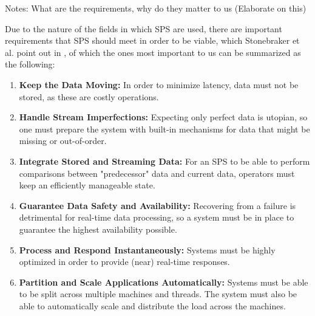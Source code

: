         Notes: What are the requirements, why do they matter to us (Elaborate on this)

        Due to the nature of the fields in which SPS are used, there are important requirements that SPS should meet in order to be viable, 
        which Stonebraker et al. point out in \cite{Stonebraker:2005:RRS:1107499.1107504}, of which the ones most important to us can be summarized as the following:
        
        \begin{enumerate}
        \label{enum:requirements}
            \item \textbf{Keep the Data Moving:} 
                In order to minimize latency, data must not be stored, as these are costly operations.
            \item \textbf{Handle Stream Imperfections:} 
                Expecting only perfect data is utopian, so one must prepare the system with built-in mechanisms for data that might be missing or out-of-order.
            \item \textbf{Integrate Stored and Streaming Data:} 
                For an SPS to be able to perform comparisons between "predecessor" data and current data, operators must keep an efficiently manageable state.
            \item \textbf{Guarantee Data Safety and Availability:} 
                Recovering from a failure is detrimental for real-time data processing, so a system must be in place to guarantee the highest availability possible.
            \item \textbf{Process and Respond Instantaneously:} 
                Systems must be highly optimized in order to provide (near) real-time responses.
            \item \textbf{Partition and Scale Applications Automatically:} 
                Systems must be able to be split across multiple machines and threads.
                The system must also be able to automatically scale and distribute the load across the machines.

        \end{enumerate}

